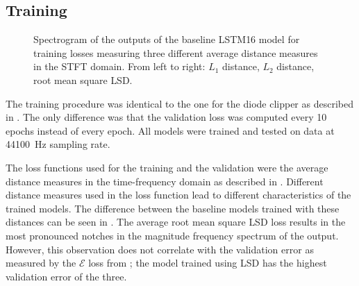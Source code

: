 \subsection{Training}
\label{sec:phaser_training}

\begin{figure}[t]
    \begin{subfigure}{0.33\textwidth}
        \centering
        \scalebox{\scaleboxsize}{}
    \end{subfigure}
    \begin{subfigure}{0.28\textwidth}
        \centering
        \scalebox{\scaleboxsize}{}
    \end{subfigure}
    \begin{subfigure}{0.34\textwidth}
        \centering
        \scalebox{0.61}{}
    \end{subfigure}
    \caption{Spectrogram of the outputs of the baseline \ac{LSTM}16 model for training losses measuring three different average distance measures in the \ac{STFT} domain. From left to right: $L_1$ distance, $L_2$ distance, root mean square \ac{LSD}.}
    \label{fig:spectral_distances}
\end{figure}

The training procedure was identical to the one for the diode clipper as described in . The only difference was that the validation loss was computed every 10 epochs instead of every epoch. All models were trained and tested on data at \SI{44100}{Hz} sampling rate.

The loss functions used for the training and the validation were the average distance measures in the time-frequency domain as described in . Different distance measures used in the loss function lead to different characteristics of the trained models. The difference between the baseline models trained with these distances can be seen in . The average root mean square \ac{LSD} loss results in the most pronounced notches in the magnitude frequency spectrum of the output. However, this observation does not correlate with the validation error as measured by the $\mathcal{E}$ loss from ; the model trained using \ac{LSD} has the highest validation error of the three. 

